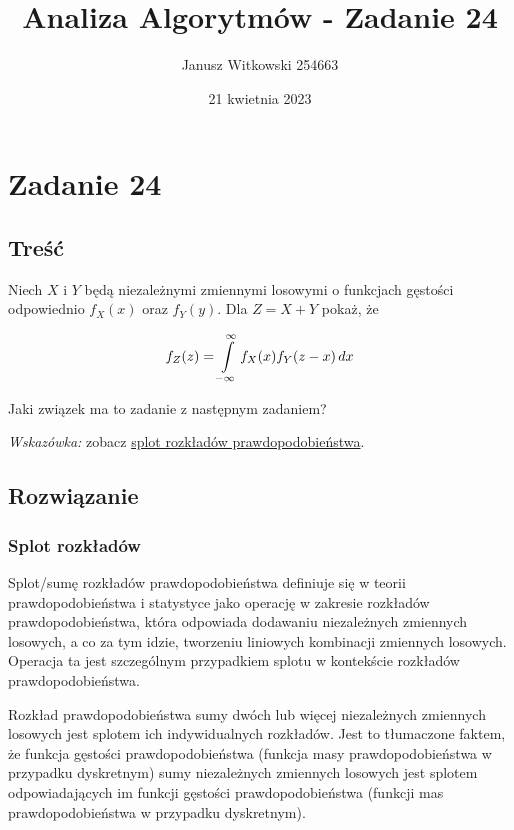 \documentclass{article}
\title{Analiza Algorytmów - Zadanie 24}
\author{Janusz Witkowski 254663}
\date{21 kwietnia 2023}
\begin{document}
    \maketitle
    

    \section{Zadanie 24}
    \subsection{Treść}
    Niech $X$ i $Y$ będą niezależnymi zmiennymi losowymi o funkcjach gęstości odpowiednio $f_X(x)$ oraz $f_Y(y)$. Dla $Z = X + Y$ pokaż, że

    \[ f_Z(z) = \int\displaylimits_{-\infty}^{\infty} f_X(x)f_Y(z - x) \,dx \]

    Jaki związek ma to zadanie z następnym zadaniem?

    \textit{Wskazówka:} zobacz \href{https://en.wikipedia.org/wiki/Convolution_of_probability_distributions}{splot rozkładów prawdopodobieństwa}. 


    \subsection{Rozwiązanie}
    \subsubsection{Splot rozkładów}

    Splot/sumę rozkładów prawdopodobieństwa definiuje się w teorii prawdopodobieństwa i statystyce jako operację w zakresie rozkładów prawdopodobieństwa, 
    która odpowiada dodawaniu niezależnych zmiennych losowych, a co za tym idzie, tworzeniu liniowych kombinacji zmiennych losowych. 
    Operacja ta jest szczególnym przypadkiem splotu w kontekście rozkładów prawdopodobieństwa.

    Rozkład prawdopodobieństwa sumy dwóch lub więcej niezależnych zmiennych losowych jest splotem ich indywidualnych rozkładów. 
    Jest to tłumaczone faktem, że funkcja gęstości prawdopodobieństwa (funkcja masy prawdopodobieństwa w przypadku dyskretnym) sumy niezależnych zmiennych losowych 
    jest splotem odpowiadających im funkcji gęstości prawdopodobieństwa (funkcji mas prawdopodobieństwa w przypadku dyskretnym). 
\end{document}
